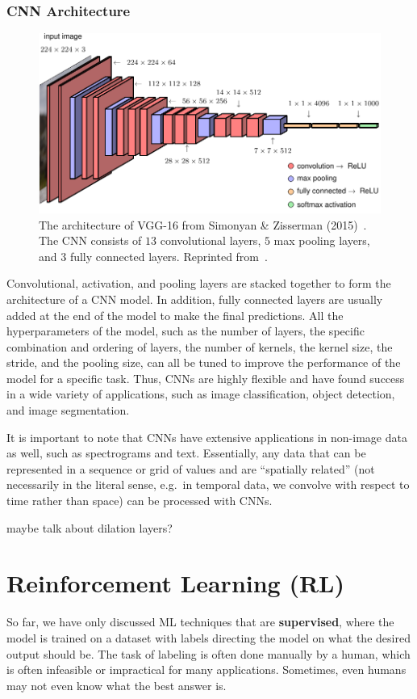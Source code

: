 \documentclass[12pt]{report}
\theoremstyle{definition}
\theoremstyle{remark}
\begin{document}
\subsection{CNN Architecture}
\begin{figure}[h]
    \centering
    \includegraphics[width=\linewidth]{figs/vgg-16.pdf}
    \caption{The architecture of VGG-16 from Simonyan \& Zisserman (2015)~\cite{simonyan_very_2015}. The CNN consists of $13$ convolutional layers, $5$ max pooling layers, and $3$ fully connected layers. Reprinted from~\cite{bishop_deep_2023}.}
\end{figure}
Convolutional, activation, and pooling layers are stacked together to form the architecture of a CNN model. In addition, fully connected layers are usually added at the end of the model to make the final predictions. All the hyperparameters of the model, such as the number of layers, the specific combination and ordering of layers, the number of kernels, the kernel size, the stride, and the pooling size, can all be tuned to improve the performance of the model for a specific task. Thus, CNNs are highly flexible and have found success in a wide variety of applications, such as image classification, object detection, and image segmentation.

It is important to note that CNNs have extensive applications in non-image data as well, such as spectrograms and text. Essentially, any data that can be represented in a sequence or grid of values and are ``spatially related'' (not necessarily in the literal sense, e.g.\ in temporal data, we convolve with respect to time rather than space) can be processed with CNNs.

maybe talk about dilation layers?

\chapter{Reinforcement Learning (RL)} %
So far, we have only discussed ML techniques that are \textbf{supervised}, where the model is trained on a dataset with labels directing the model on what the desired output should be. The task of labeling is often done manually by a human, which is often infeasible or impractical for many applications. Sometimes, even humans may not even know what the best answer is.
\end{document}
